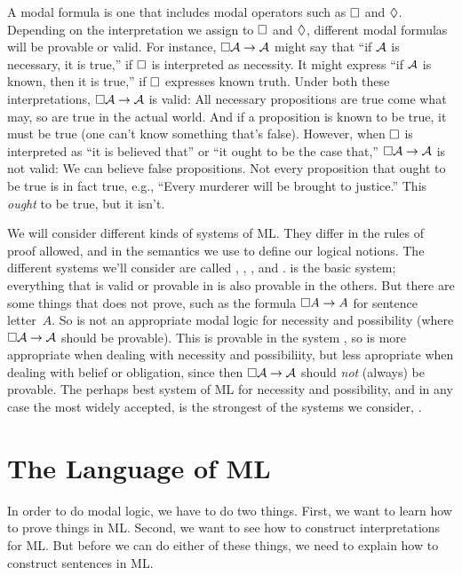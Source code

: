 A modal formula is one that includes modal operators such as $\Box$ and $\Diamond$. Depending on the interpretation we assign to $\Box$ and $\Diamond$, different modal formulas will be provable or valid. For instance, $\Box \mathcal{A} \rightarrow \mathcal{A}$ might say that ``if $\mathcal{A}$ is necessary, it is true,'' if $\Box$ is interpreted as necessity. It might express ``if $\mathcal{A}$ is known, then it is true,'' if $\Box$ expresses known truth. Under both these interpretations, $\Box\mathcal{A} \rightarrow \mathcal{A}$ is valid: All necessary propositions are true come what may, so are true in the actual world. And if a proposition is known to be true, it must be true (one can't know something that's false). However, when $\Box$ is interpreted as ``it is believed that'' or ``it ought to be the case that,'' $\Box\mathcal{A} \rightarrow \mathcal{A}$ is not valid: We can believe false propositions. Not every proposition that ought to be true is in fact true, e.g., ``Every murderer will be brought to justice.'' This \emph{ought} to be true, but it isn't.

We will consider different kinds of systems of ML. They differ in the rules of proof allowed, and in the semantics we use to define our logical notions. The different systems we'll consider are called \mlK, \mlT, \mlSfour, and \mlSfive. \mlK{} is the basic system; everything that is valid or provable in \mlK{} is also provable in the others. But there are some things that \mlK{} does not prove, such as the formula $\Box A \rightarrow A$ for sentence letter~$A$. So \mlK{} is not an appropriate modal logic for necessity and possibility (where $\Box\mathcal{A} \rightarrow \mathcal{A}$ should be provable). This is provable in the system \mlT, so \mlT{} is more appropriate when dealing with necessity and possibiliity, but less apropriate when dealing with belief or obligation, since then $\Box\mathcal{A} \rightarrow \mathcal{A}$ should \emph{not} (always) be provable. The perhaps best system of ML for necessity and possibility, and in any case the most widely accepted, is the strongest of the systems we consider, \mlSfive.

\section{The Language of ML}
\label{TFLtoML}

In order to do modal logic, we have to do two things. First, we want to learn how to prove things in ML. Second, we want to see how to construct interpretations for ML. But before we can do either of these things, we need to explain how to construct sentences in ML.

